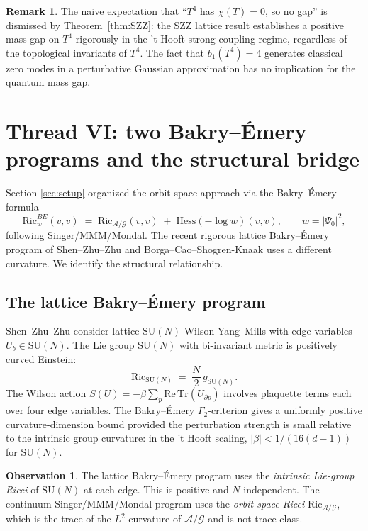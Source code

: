 \documentclass[11pt,letterpaper]{article}
\theoremstyle{definition}
\newtheorem{remark}[theorem]{Remark}
\newtheorem{observation}[theorem]{Observation}
\newcommand{\cA}{\mathcal{A}}
\newcommand{\cG}{\mathcal{G}}
\newcommand{\Tr}{\mathrm{Tr}}
\newcommand{\Hess}{\mathrm{Hess}}
\newcommand{\Ric}{\mathrm{Ric}}
\begin{document}
\begin{remark}\label{rmk:b1-and-gap}
The naive expectation that ``$T^4$ has $\chi(T) = 0$, so no gap'' is dismissed by Theorem~\ref{thm:SZZ}: the SZZ lattice result establishes a positive mass gap on $T^4$ rigorously in the 't Hooft strong-coupling regime, regardless of the topological invariants of $T^4$. The fact that $b_1(T^4) = 4$ generates classical zero modes in a perturbative Gaussian approximation has no implication for the quantum mass gap.
\end{remark}

\section{Thread VI: two Bakry--\'Emery programs and the structural bridge}\label{sec:two-BE}

Section \ref{sec:setup} organized the orbit-space approach via the Bakry--\'Emery formula
\begin{equation}\label{eq:BE-Ric}
\Ric^{BE}_w(v,v) \;=\; \Ric_{\cA/\cG}(v,v) \;+\; \Hess(-\log w)(v,v), \qquad w = |\Psi_0|^2,
\end{equation}
following Singer/MMM/Mondal. The recent rigorous lattice Bakry--\'Emery program of Shen--Zhu--Zhu \cite{SZZ2022} and Borga--Cao--Shogren-Knaak \cite{BCS2025} uses a different curvature. We identify the structural relationship.

\subsection{The lattice Bakry--\'Emery program}

Shen--Zhu--Zhu consider lattice $\mathrm{SU}(N)$ Wilson Yang--Mills with edge variables $U_b \in \mathrm{SU}(N)$. The Lie group $\mathrm{SU}(N)$ with bi-invariant metric is positively curved Einstein:
\begin{equation}\label{eq:SUN-Ric}
\Ric_{\mathrm{SU}(N)} \;=\; \frac{N}{2}\,g_{\mathrm{SU}(N)}.
\end{equation}
The Wilson action $S(U) = -\beta \sum_p \mathrm{Re}\,\Tr(U_{\partial p})$ involves plaquette terms each over four edge variables. The Bakry--\'Emery $\Gamma_2$-criterion gives a uniformly positive curvature-dimension bound provided the perturbation strength is small relative to the intrinsic group curvature: in the 't Hooft scaling, $|\beta| < 1/(16(d-1))$ for $\mathrm{SU}(N)$.

\begin{observation}\label{obs:two-curvatures}
The lattice Bakry--\'Emery program uses the \emph{intrinsic Lie-group Ricci} of $\mathrm{SU}(N)$ at each edge. This is positive and $N$-independent. The continuum Singer/MMM/Mondal program uses the \emph{orbit-space Ricci} $\Ric_{\cA/\cG}$, which is the trace of the $L^2$-curvature of $\cA/\cG$ and is not trace-class.
\end{observation}
\end{document}
